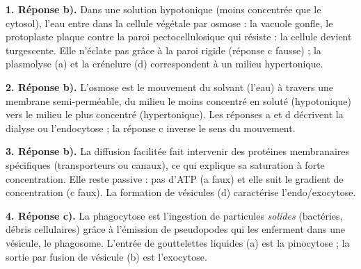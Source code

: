 \documentclass[11pt]{article}
\newcommand{\cle}[1]{{\popxbold\color{popdark}#1}}
\begin{document}
\begin{corrige}
\textbf{1. Réponse b).} Dans une solution \cle{hypotonique} (moins concentrée que le cytosol), l'eau entre dans la cellule végétale par osmose : la vacuole gonfle, le protoplaste plaque contre la paroi pectocellulosique qui résiste : la cellule devient \cle{turgescente}. Elle n'éclate pas grâce à la paroi rigide (réponse c fausse) ; la plasmolyse (a) et la crénelure (d) correspondent à un milieu hypertonique.

\textbf{2. Réponse b).} L'\cle{osmose} est le mouvement du solvant (l'eau) à travers une membrane \cle{semi-perméable}, du milieu le moins concentré en soluté (hypotonique) vers le milieu le plus concentré (hypertonique). Les réponses a et d décrivent la dialyse ou l'endocytose ; la réponse c inverse le sens du mouvement.

\textbf{3. Réponse b).} La \cle{diffusion facilitée} fait intervenir des \cle{protéines membranaires spécifiques} (transporteurs ou canaux), ce qui explique sa saturation à forte concentration. Elle reste passive : pas d'ATP (a faux) et elle suit le gradient de concentration (c faux). La formation de vésicules (d) caractérise l'endo/exocytose.

\textbf{4. Réponse c).} La \cle{phagocytose} est l'ingestion de particules \emph{solides} (bactéries, débris cellulaires) grâce à l'émission de \cle{pseudopodes} qui les enferment dans une vésicule, le phagosome. L'entrée de gouttelettes liquides (a) est la pinocytose ; la sortie par fusion de vésicule (b) est l'exocytose.
\end{corrige}
\end{document}
